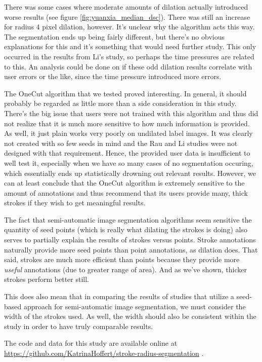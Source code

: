 \documentclass[12pt,a4paper,notitlepage]{article}
\begin{document}
There was some cases where moderate amounts of dilation actually introduced worse results (see figure \ref{fig:yuanxia_median_dsc}). There was still an increase for radius 4 pixel dilation, however. It's unclear why the algorithm acts this way. The segmentation ends up being fairly different, but there's no obvious explanations for this and it's something that would need further study. This only occurred in the results from Li's study, so perhaps the time pressures are related to this. An analysis could be done on if these odd dilation results correlate with user errors or the like, since the time pressure introduced more errors.

The OneCut algorithm that we tested proved interesting. In general, it should probably be regarded as little more than a side consideration in this study. There's the big issue that users were not trained with this algorithm and thus did not realize that it is much more sensitive to how much information is provided. As well, it just plain works very poorly on undilated label images. It was clearly not created with so few seeds in mind and the Rau and Li studies were not designed with that requirement. Hence, the provided user data is insufficient to well test it, especially when we have so many cases of no segmentation occuring, which essentially ends up statistically drowning out relevant results. However, we can at least conclude that the OneCut algorithm is extremely sensitive to the amount of annotations and thus recommend that its users provide many, thick strokes if they wish to get meaningful results.

The fact that semi-automatic image segmentation algorithms seem sensitive the quantity of seed points (which is really what dilating the strokes is doing) also serves to partially explain the results of strokes versus points. Stroke annotations naturally provide more seed points than point annotations, as dilation does. That said, strokes are much more efficient than points because they provide more \textit{useful} annotations (due to greater range of area). And as we've shown, thicker strokes perform better still.

This does also mean that in comparing the results of studies that utilize a seed-based approach for semi-automatic image segmentation, we must consider the width of the strokes used. As well, the width should also be consistent within the study in order to have truly comparable results.

The code and data for this study are available online at \url{https://github.com/KatrinaHoffert/stroke-radius-segmentation} \cite{repo}.



\end{document}
